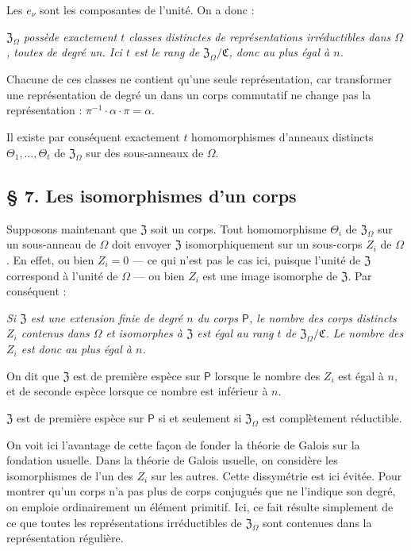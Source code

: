 Les \(e_\nu\) sont les composantes de l'unité. On a donc :

\emph{\(\mathfrak Z_\Omega\) possède exactement \(t\) classes distinctes de représentations irréductibles dans \(\Omega\), toutes de degré un. Ici \(t\) est le rang de \(\mathfrak Z_\Omega/\mathfrak C\), donc au plus égal à \(n\).}

Chacune de ces classes ne contient qu'une seule représentation, car transformer une représentation de degré un dans un corps commutatif ne change pas la représentation : \(\pi^{-1}\cdot\alpha\cdot\pi=\alpha\).

Il existe par conséquent exactement \(t\) homomorphismes d'anneaux distincts \(\Theta_1,\ldots,\Theta_t\) de \(\mathfrak Z_\Omega\) sur des sous-anneaux de \(\Omega\).

\subsection*{\S{} 7. Les isomorphismes d'un corps}\label{die-isomorphismen-eines-koerpers}

Supposons maintenant que \(\mathfrak Z\) soit un corps. Tout homomorphisme \(\Theta_i\) de \(\mathfrak Z_\Omega\) sur un sous-anneau de \(\Omega\) doit envoyer \(\mathfrak Z\) isomorphiquement sur un sous-corps \(Z_i\) de \(\Omega\). En effet, ou bien \(Z_i=0\) --- ce qui n'est pas le cas ici, puisque l'unité de \(\mathfrak Z\) correspond à l'unité de \(\Omega\) --- ou bien \(Z_i\) est une image isomorphe de \(\mathfrak Z\). Par conséquent :

\emph{Si \(\mathfrak Z\) est une extension finie de degré \(n\) du corps \(\mathsf P\), le nombre des corps distincts \(Z_i\) contenus dans \(\Omega\) et isomorphes à \(\mathfrak Z\) est égal au rang \(t\) de \(\mathfrak Z_\Omega/\mathfrak C\). Le nombre des \(Z_i\) est donc au plus égal à \(n\).}

On dit que \(\mathfrak Z\) est de première espèce sur \(\mathsf P\) lorsque le nombre des \(Z_i\) est égal à \(n\), et de seconde espèce lorsque ce nombre est inférieur à \(n\).

\(\mathfrak Z\) est de première espèce sur \(\mathsf P\) si et seulement si \(\mathfrak Z_\Omega\) est complètement réductible.

On voit ici l'avantage de cette façon de fonder la théorie de Galois sur la fondation usuelle. Dans la théorie de Galois usuelle, on considère les isomorphismes de l'un des \(Z_i\) sur les autres. Cette dissymétrie est ici évitée. Pour montrer qu'un corps n'a pas plus de corps conjugués que ne l'indique son degré, on emploie ordinairement un élément primitif. Ici, ce fait résulte simplement de ce que toutes les représentations irréductibles de \(\mathfrak Z_\Omega\) sont contenues dans la représentation régulière.

